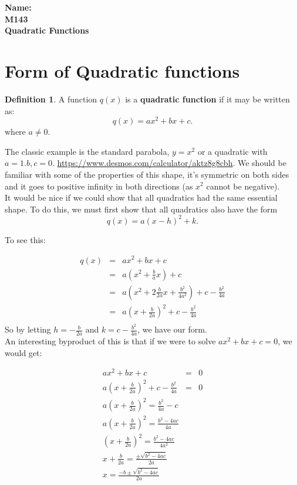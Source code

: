 \documentclass[10pt]{article}
\theoremstyle{definition}
\newtheorem{definition}[equation]{Definition}
\begin{document}
%

{\bf Name:} \hrulefill\hrulefill\hrulefill\\
{\bf M143} \qquad \qquad \\
{\bf Quadratic Functions}\\ %

\section{Form of Quadratic functions}

\begin{definition}
A function $q(x)$ is a {\bf quadratic function} if it may be written as: $$q(x)=ax^2+bx+c.$$ where $a\neq0$.
\end{definition}

The classic example is the standard parabola,  $y=x^2$ or a quadratic with $a=1. b,c=0$.  \url{https://www.desmos.com/calculator/aktz8g8cbh}.  We should be familiar with some of the properties of this shape, it's symmetric on both sides and it goes to positive  infinity in both directions (as $x^2$ cannot be negative).\\

It would be nice if we could show that all quadratics had the same essential shape.  To do this, we must first show that all quadratics also have the form $$q(x)=a(x-h)^2+k.$$

To see this:

\begin{eqnarray*}
q(x)&=&ax^2+bx+c\\
&=&a(x^2+\frac{b}{a}x)+c\\
&=&a(x^2+2\frac{b}{2a}x+\frac{b^2}{4a^2})+c-\frac{b^2}{4a}\\
&=&a(x+\frac{b}{2a})^2+c-\frac{b^2}{4a}\\
\end{eqnarray*}
So by letting $h=-\frac{b}{2a}$ and $k=c-\frac{b^2}{4a}$, we have our form.\\

An interesting byproduct of this is that if we were to solve $ax^2+bx+c=0$, we would get:

\begin{eqnarray*}
ax^2+bx+c&=&0\\
a(x+\frac{b}{2a})^2+c-\frac{b^2}{4a}&=&0\\
a(x+\frac{b}{2a})^2=\frac{b^2}{4a}-c\\
a(x+\frac{b}{2a})^2=\frac{b^2-4ac}{4a}\\
(x+\frac{b}{2a})^2=\frac{b^2-4ac}{4a^2}\\
x+\frac{b}{2a}=\frac{\pm\sqrt{b^2-4ac}}{2a}\\
x=\frac{-b\pm\sqrt{b^2-4ac}}{2a}\\
\end{eqnarray*}
\end{document}
